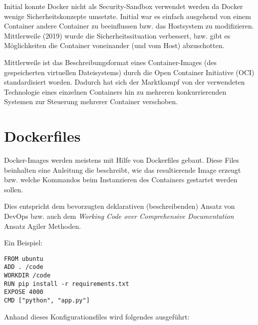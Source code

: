 Initial konnte Docker nicht als Security-Sandbox verwendet werden da Docker wenige Sicherheitskonzepte umsetzte. Initial war es einfach ausgehend von einem Container andere Container zu beeinflussen bzw. das Hostsystem zu modifizieren. Mittlerweile (2019) wurde die Sicherheitssituation verbessert, bzw. gibt es Möglichkeiten die Container voneinander (und vom Host) abzuschotten.

Mittlerweile ist das Beschreibungsformat eines Container-Images (des gespeicherten virtuellen Dateisystems) durch die Open Container Initiative (OCI) standardisiert worden. Dadurch hat sich der Marktkampf von der verwendeten Technologie eines einzelnen Containers hin zu mehreren konkurrierenden Systemen zur Steuerung mehrerer Container verschoben.

\section{Dockerfiles}

Docker-Images werden meistens mit Hilfe von Dockerfiles gebaut. Diese Files beinhalten eine Anleitung die beschreibt, wie das resultierende Image erzeugt bzw. welche Kommandos beim Instanzieren des Containers gestartet werden sollen.

Dies entspricht dem bevorzugten deklarativen (beschreibenden) Ansatz von DevOps bzw. auch dem \textit{Working Code over Comprehensive Documentation} Ansatz Agiler Methoden.

Ein Beispiel:

\begin{verbatim}
FROM ubuntu
ADD . /code
WORKDIR /code
RUN pip install -r requirements.txt
EXPOSE 4000
CMD ["python", "app.py"]
\end{verbatim}

Anhand dieses Konfigurationsfiles wird folgendes ausgeführt:

